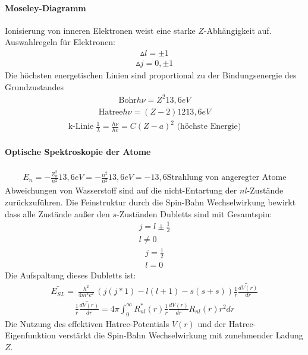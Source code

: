 \documentclass[10pt,a4paper]{article}
\begin{document}
\paragraph{Moseley-Diagramm}
Ionisierung von inneren Elektronen weist eine starke $Z$-Abhängigkeit auf.\\
Auswahlregeln für Elektronen:
\begin{align}
\vartriangle l= \pm 1
\end{align}
\begin{align}
\vartriangle j= 0, \pm 1
\end{align}
Die höchsten energetischen Linien sind proportional zu der Bindungsenergie des Grundzustandes
\begin{align}
\text{Bohr} h \nu= Z^2 13,6 eV
\end{align}
\begin{align}
\text{Hatree} h \nu= (Z-2)12 13,6 eV
\end{align}
\begin{align}
\text{k-Linie}\; \frac{1}{\lambda}=\frac{h \nu}{hc}= C(Z-a)^2 \text{ (höchste Energie)}
\end{align}
\paragraph{Optische Spektroskopie der Atome}
\begin{align}
E_n=-\frac{Z_n^2}{n^2} 13,6 eV= -\frac{n^2}{n^2} 13,6 eV = -13,6 \text{Strahlung von angeregter Atome}
\end{align}
Abweichungen von Wasserstoff sind auf die nicht-Entartung der $nl$-Zustände zurückzuführen. Die Feinstruktur durch die Spin-Bahn Wechselwirkung bewirkt dass alle Zustände außer den $s$-Zuständen Dubletts sind mit Gesamtspin:
\begin{align}
j=l \pm \frac{1}{2} \\
l \neq 0
\end{align}
\begin{align}
j= \frac{1}{2} \\
l=0
\end{align}
Die Aufspaltung dieses Dubletts ist:
\begin{align}
\bar{E_{SL}}=\frac{\hslash^2}{4 m^2 c^2} (j(j*1)-l(l+1)-s(s+s)) \bar{\frac{1}{r}\frac{dV(r)}{dr}}
\end{align}
\begin{align}
\bar{\frac{1}{r}\frac{dV(r)}{dr}}= 4 \pi \int_0^{\infty} R_{nl}^*(r) \frac{1}{r} \frac{dV(r)}{dr} R_{nl}(r) r^2 dr
\end{align}
Die Nutzung des effektiven Hatree-Potentials $V(r) $ und der Hatree-Eigenfunktion verstärkt die Spin-Bahn Wechselwirkung mit zunehmender Ladung $Z$.
\end{document}
